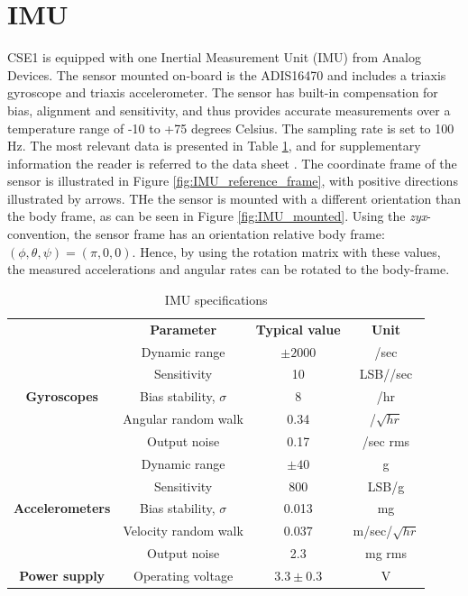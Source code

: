 \section{IMU}
CSE1 is equipped with one Inertial Measurement Unit (IMU) from Analog Devices. The sensor mounted on-board is the ADIS16470 and includes a triaxis gyroscope and triaxis accelerometer. The sensor has built-in compensation for bias, alignment and sensitivity, and thus provides accurate measurements over a temperature range of -10 to +75 degrees Celsius. The sampling rate is set to 100 Hz. The most relevant data is presented in Table \ref{tab:IMU_specifications}, and for supplementary information the reader is referred to the data sheet \cite{adis16470}. The coordinate frame of the sensor is illustrated in Figure \ref{fig:IMU_reference_frame}, with positive directions illustrated by arrows. THe the sensor is mounted with a different orientation than the body frame, as can be seen in Figure \ref{fig:IMU_mounted}. Using the \textit{zyx}-convention, the sensor frame has an orientation relative body frame: $(\phi, \theta, \psi) = (\pi, 0, 0)$. Hence, by using the rotation matrix with these values, the measured accelerations and angular rates can be rotated to the body-frame. 
\begin{table}[htb!]\caption{IMU specifications}\label{tab:IMU_specifications}
	\centering
	\begin{tabular}{c|c|c|c|}
		\cline{2-4}
		& \textbf{Parameter} & \textbf{Typical value} & \textbf{Unit}\\ \cline{1-4}
		\multicolumn{1}{|c|}{\multirow{5}{*}{\textbf{Gyroscopes}}} & Dynamic range & $\pm 2000$ & \degree/sec\\ 
		\multicolumn{1}{|c|}{} & Sensitivity & 10 & LSB/\degree/sec\\ 
		\multicolumn{1}{|c|}{} & Bias stability, $\sigma$ & 8 & \degree/hr\\ 
		\multicolumn{1}{|c|}{} & Angular random walk & 0.34 & \degree/$\sqrt{hr}$\\ 
		\multicolumn{1}{|c|}{} & Output noise & 0.17 & \degree/sec rms\\ \cline{1-4}
		
		\multicolumn{1}{|c|}{\multirow{5}{*}{\textbf{Accelerometers}}} & Dynamic range & $\pm 40$ & g\\ 
		\multicolumn{1}{|c|}{} & Sensitivity & 800 & LSB/g\\ 
		\multicolumn{1}{|c|}{} & Bias stability, $\sigma$ & 0.013 & mg\\ 
		\multicolumn{1}{|c|}{} & Velocity random walk & 0.037 & m/sec/$\sqrt{hr}$\\ 
		\multicolumn{1}{|c|}{} & Output noise & 2.3 & mg rms\\ \cline{1-4}
		
		\multicolumn{1}{|c|}{\multirow{1}{*}{\textbf{Power supply}}} & Operating voltage& $3.3 \pm 0.3$ & V\\ \cline{1-4}
	\end{tabular}
\end{table}
